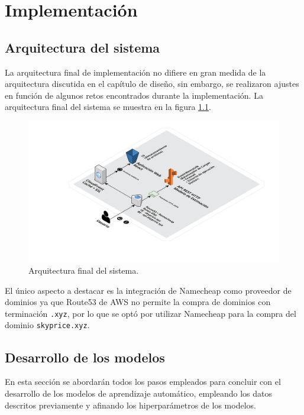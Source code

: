 \chapter{\textcolor{azulescom}{Implementación}}

\section{Arquitectura del sistema}
La arquitectura final de implementación no difiere en gran medida de la arquitectura
discutida en el capítulo de diseño, sin embargo, se realizaron ajustes en función de
algunos retos encontrados durante la implementación. La arquitectura final del sistema
se muestra en la figura \ref{fig:arquitectura-final}.

\begin{figure}[H]
    \centering
    \includegraphics[width=1.0\textwidth]{imagenes/05-implementacion/arquitectura/arquitectura-final.png}
    \caption{Arquitectura final del sistema.}
    \label{fig:arquitectura-final}
\end{figure}

El único aspecto a destacar es la integración de Namecheap como proveedor de dominios
ya que Route53 de AWS no permite la compra de dominios con terminación \texttt{.xyz},
por lo que se optó por utilizar Namecheap para la compra del dominio \texttt{skyprice.xyz}.

\section{Desarrollo de los modelos}

En esta sección se abordarán todos los pasos empleados para concluir con el
desarrollo de los modelos de aprendizaje automático, empleando los datos descritos
previamente y afinando los hiperparámetros de los modelos.

